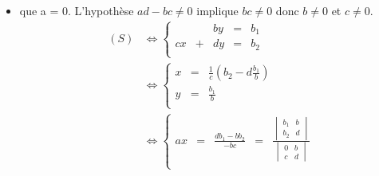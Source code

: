 \documentclass{article}
\renewenvironment{question_kholle}[2][ ]
{
	\subsection{\texorpdfstring{#2}{}}
	\notblank{#1}
	{
		\noindent #1
		\bigbreak
	}
	{}
	\begin{proof}
}
{
	\end{proof}
}
\begin{document}
\begin{question_kholle}
\begin{itemize}[label=$\bullet$ Supposons]
\begin{itemize}[label=$\bullet$ Supposons]
\begin{equation*}
\begin{aligned}
\begin{array}{ccccc}
                        y  & = & \frac{ab_2 - cb_1}{ad - bc} & = & \frac{\begin{vmatrix}a&b_1\\c&b_2\end{vmatrix}}{\begin{vmatrix}a&b\\c&d\end{vmatrix}} \\
                      \end{array}
                      \right.
                    \end{aligned}
                  \end{equation*}
                  Donc le système admet une unique solution qui est celle annoncée.

            \item que a = 0. L'hypothèse $ad - bc \neq 0$ implique $bc \neq 0$ donc $b \neq 0$ et $c \neq 0$.
                  \begin{equation*}
                    \begin{aligned}
                      (S)
                       & \iff \left\{
                      \begin{array}{ccccc}
                           &   & by & = & b_1 \\
                        cx & + & dy & = & b_2 \\
                      \end{array}
                      \right.         \\
                       & \iff \left\{
                      \begin{array}{ccc}
                        x & = & \frac{1}{c} \left( b_2 - d\frac{b_1}{b} \right) \\
                        y & = & \frac{b_1}{b}                                   \\
                      \end{array}
                      \right.         \\
                       & \iff \left\{
                      \begin{array}{ccccc}
                        ax & = & \frac{db_1 - bb_2}{- bc} & = & \frac{\begin{vmatrix}b_1&b\\b_2&d\end{vmatrix}}{\begin{vmatrix}0&b\\c&d\end{vmatrix}} \\

\end{array}
\end{aligned}
\end{equation*}
\end{itemize}
\end{itemize}
\end{question_kholle}
\end{document}
